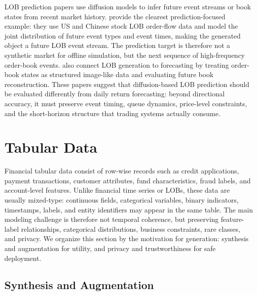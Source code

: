\documentclass[sigconf,nonacm]{acmart}
\begin{document}
LOB prediction papers use diffusion models to infer future event streams or book
states from recent market history. \citet{zheng2024lobdif} provide the clearest
prediction-focused example: they use US and Chinese stock LOB order-flow data and
model the joint distribution of future event types and event times, making the
generated object a future LOB event stream. The prediction target is therefore
not a synthetic market for offline simulation, but the next sequence of
high-frequency order-book events. \citet{backhouse2025painting} also connect LOB
generation to forecasting by treating order-book states as structured
image-like data and evaluating future book reconstruction. These papers suggest
that diffusion-based LOB prediction should be evaluated differently from daily
return forecasting: beyond directional accuracy, it must preserve event timing,
queue dynamics, price-level constraints, and the short-horizon structure that
trading systems actually consume.

\section{Tabular Data}\label{sec:tabular}

Financial tabular data consist of row-wise records such as credit applications,
payment transactions, customer attributes, fund characteristics, fraud labels,
and account-level features. Unlike financial time series or LOBs, these data are
usually mixed-type: continuous fields, categorical variables, binary indicators,
timestamps, labels, and entity identifiers may appear in the same table. The
main modeling challenge is therefore not temporal coherence, but preserving
feature-label relationships, categorical distributions, business constraints,
rare classes, and privacy. We organize this section by the motivation for
generation: synthesis and augmentation for utility, and privacy and
trustworthiness for safe deployment.

\subsection{Synthesis and Augmentation}\label{sec:tabular-synthesis}
\end{document}
